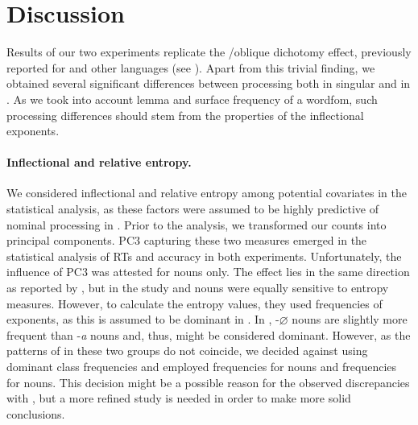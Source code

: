 \documentclass[output=paper, modfonts,newtxmath,hidelinks]{langscibook}
\begin{document}
\section{Discussion}
Results of our two experiments replicate the \slash oblique dichotomy effect, previously reported for  and other languages (see ). Apart from this trivial finding, we obtained several significant differences between  processing both in singular and in . As we took into account lemma and surface frequency of a wordfom, such  processing differences should stem from the properties of the inflectional exponents.\\

\paragraph*{Inflectional and relative entropy.} We considered inflectional and relative entropy among potential covariates in the statistical analysis, as these factors were assumed to be highly predictive of nominal processing in  \citep{milin2009simultaneous}. Prior to the analysis, we transformed our counts into principal components. PC3 capturing these two measures emerged in the statistical analysis of RTs and accuracy in both experiments. Unfortunately, the influence of PC3 was attested for  nouns only. The effect lies in the same direction as reported by \citet*{milin2009simultaneous}, but in the  study  and  nouns were equally sensitive to entropy measures. However, to calculate the entropy values, they used frequencies of  exponents, as this  is assumed to be dominant in . In ,  -$\varnothing$ nouns are slightly more frequent than  -\textit{a} nouns \citep{samojlova2014frequencies} and, thus, might be considered dominant. However, as the patterns of  in these two  groups do not coincide, we decided against using dominant class frequencies and employed  frequencies for  nouns and  frequencies for  nouns. This decision might be a possible reason for the observed discrepancies with \citet{milin2009simultaneous}, but a more refined study is needed in order to make more solid conclusions.\\
\end{document}
